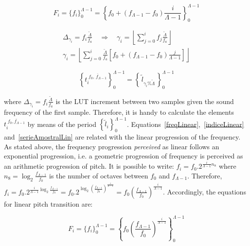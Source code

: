 \begin{equation}\label{freqLinear}
 F_i=\{f_i\}_0^{\Lambda-1}=\left\{f_0 + (f_{\Lambda-1}-f_0)\frac{i}{\Lambda-1} \right\}_0^{\Lambda-1}
\end{equation}

\begin{equation}\label{indiceLinear}
\begin{split}
 \Delta_{\gamma_i}=f_i\frac{\widetilde{\Lambda}}{f_a} \quad \Rightarrow \quad \gamma_i= \left \lfloor \sum_{j=0}^{i} f_j\frac{\widetilde{\Lambda}}{f_a} \right \rfloor \\
\gamma_i=  \left \lfloor \sum_{j=0}^{i} \frac{\widetilde{\Lambda}}{f_a} \left [f_0 + (f_{\Lambda-1}-f_0)\frac{j}{\Lambda-1} \right ] \right \rfloor 
\end{split}
\end{equation}

\begin{equation}\label{serieAmostralLin}
 \left\{t_i^{\;\overline{f_0,\, f_{\Lambda-1}}}\right\}_0^{\Lambda-1}=\left\{\,\widetilde{l}_{\gamma_i \% \widetilde{\Lambda}}\,\right\}_0^{\Lambda-1}
\end{equation}

where $\Delta_{\gamma_i}=f_i\frac{\widetilde{\Lambda}}{f_a}$ is the LUT increment between two samples given the sound frequency of the first sample. Therefore, it is handy to calculate the elements $t_i^{\;\overline{f_0,f_{\Lambda-1}}}$ by means of the period $\left\{\widetilde{l}_i\right\}_0^{\Lambda-1}$. Equations~\ref{freqLinear},~\ref{indiceLinear} and~\ref{serieAmostralLin} are related with the linear progression of the frequency. As stated above, the frequency progression \emph{perceived} as linear follows an exponential progression, i.e. a geometric progression of frequency is perceived as an arithmetic progression of pitch. It is possible to write: $f_i=f_0 . 2^{\frac{i}{\Lambda-1} n_8}$ where  $n_8=\log_2\frac{f_{\Lambda-1}}{f_0}$ is the number of octaves between $f_0$ and $f_{\Lambda-1}$.
Therefore, $f_i=f_0 . 2^{\frac{i}{\Lambda-1}\log_2\frac{f_{\Lambda-1}}{f_0}}=
 f_0 . 2^{\log_2\left ( \frac{f_{\Lambda-1}}{f_0} \right )^{\frac{i}{\Lambda-1}}}=
 f_0 \left ( \frac{f_{\Lambda-1}}{f_0} \right ) ^{\frac{i}{\Lambda -1}}$. Accordingly, the equations for linear pitch transition are:

\begin{equation}\label{freqExponencial}
 F_i=\{f_i\}_0^{\Lambda-1}=  \left\{f_0 \left ( \frac{f_{\Lambda-1}}{f_0} \right ) ^{\frac{i}{\Lambda -1}} \right\}_0^{\Lambda-1}
\end{equation}

